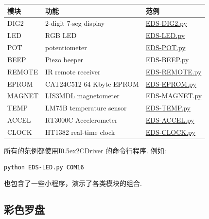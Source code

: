 \documentclass{article}
\newcommand{\two}{\raise0.5ex\hbox{\footnotesize{2}}}
\newcommand{\iicdriver}{I\two{}CDriver}
\newcommand{\gap}{\vspace{10pt}}
\begin{document}
\begin{center}\begin{tabular}{lll}
\hline
模块 &  功能                 & 范例 \\
\hline
DIG2   & 2-digit 7-seg display    & \href{https://github.com/jamesbowman/i2cdriver/blob/master/python/samples/EDS-DIG2.py}{EDS-DIG2.py} \\
LED    & RGB LED                  & \href{https://github.com/jamesbowman/i2cdriver/blob/master/python/samples/EDS-LED.py}{EDS-LED.py} \\
POT    & potentiometer            & \href{https://github.com/jamesbowman/i2cdriver/blob/master/python/samples/EDS-POT.py}{EDS-POT.py} \\
BEEP   & Piezo beeper             & \href{https://github.com/jamesbowman/i2cdriver/blob/master/python/samples/EDS-BEEP.py}{EDS-BEEP.py} \\
REMOTE & IR remote receiver       & \href{https://github.com/jamesbowman/i2cdriver/blob/master/python/samples/EDS-REMOTE.py}{EDS-REMOTE.py} \\
EPROM  & CAT24C512 64 Kbyte EPROM & \href{https://github.com/jamesbowman/i2cdriver/blob/master/python/samples/EDS-EPROM.py}{EDS-EPROM.py} \\
MAGNET & LIS3MDL magnetometer     & \href{https://github.com/jamesbowman/i2cdriver/blob/master/python/samples/EDS-MAGNET.py}{EDS-MAGNET.py} \\
TEMP   & LM75B temperature sensor & \href{https://github.com/jamesbowman/i2cdriver/blob/master/python/samples/EDS-TEMP.py}{EDS-TEMP.py} \\
ACCEL  & RT3000C Accelerometer    & \href{https://github.com/jamesbowman/i2cdriver/blob/master/python/samples/EDS-ACCEL.py}{EDS-ACCEL.py} \\
CLOCK  & HT1382 real-time clock   & \href{https://github.com/jamesbowman/i2cdriver/blob/master/python/samples/EDS-CLOCK.py}{EDS-CLOCK.py} \\
\hline
\end{tabular}\end{center}\gap


所有的范例都使用\iicdriver{} 的命令行程序. 例如:

\begin{lstlisting}
python EDS-LED.py COM16
\end{lstlisting}

也包含了一些小程序，演示了各类模块的组合.

\subsection{彩色罗盘}
\end{document}
